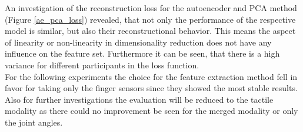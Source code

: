 An investigation of the reconstruction loss for the autoencoder and PCA method (Figure \ref{ae_pca_loss}) revealed, that not only the performance of the respective model is similar, but also their reconstructional behavior. This means the aspect of linearity or non-linearity in dimensionality reduction does not have any influence on the feature set. Furthermore it can be seen, that there is a high variance for different participants in the loss function.\\
For the following experiments the choice for the feature extraction method fell in favor for taking only the finger sensors since they showed the most stable results. Also for further investigations the evaluation will be reduced to the tactile modality as there could no improvement be seen for the merged modality or only the joint angles.
